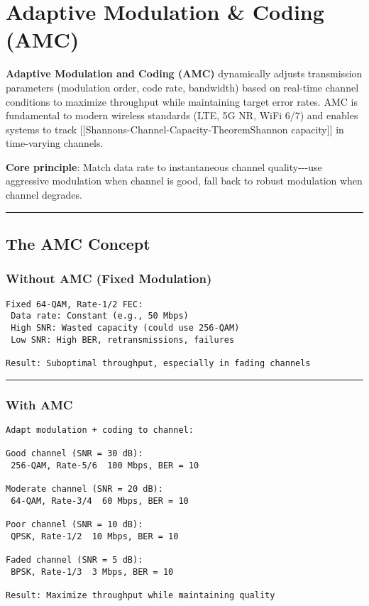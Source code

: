 \section{Adaptive Modulation \& Coding
(AMC)}\label{adaptive-modulation-coding-amc}

\textbf{Adaptive Modulation and Coding (AMC)} dynamically adjusts
transmission parameters (modulation order, code rate, bandwidth) based
on real-time channel conditions to maximize throughput while maintaining
target error rates. AMC is fundamental to modern wireless standards
(LTE, 5G NR, WiFi 6/7) and enables systems to track
{[}{[}Shannon\textquotesingle s-Channel-Capacity-Theorem\textbar Shannon
capacity{]}{]} in time-varying channels.

\textbf{Core principle}: Match data rate to instantaneous channel
quality-\/-\/-use aggressive modulation when channel is good, fall back
to robust modulation when channel degrades.

\begin{center}\rule{0.5\linewidth}{0.5pt}\end{center}

\subsection{\texorpdfstring{ The AMC
Concept}{ The AMC Concept}}\label{the-amc-concept}

\subsubsection{Without AMC (Fixed
Modulation)}\label{without-amc-fixed-modulation}

\begin{verbatim}
Fixed 64-QAM, Rate-1/2 FEC:
 Data rate: Constant (e.g., 50 Mbps)
 High SNR: Wasted capacity (could use 256-QAM)
 Low SNR: High BER, retransmissions, failures

Result: Suboptimal throughput, especially in fading channels
\end{verbatim}

\begin{center}\rule{0.5\linewidth}{0.5pt}\end{center}

\subsubsection{With AMC}\label{with-amc}

\begin{verbatim}
Adapt modulation + coding to channel:

Good channel (SNR = 30 dB):
 256-QAM, Rate-5/6  100 Mbps, BER = 10 

Moderate channel (SNR = 20 dB):
 64-QAM, Rate-3/4  60 Mbps, BER = 10 

Poor channel (SNR = 10 dB):
 QPSK, Rate-1/2  10 Mbps, BER = 10 

Faded channel (SNR = 5 dB):
 BPSK, Rate-1/3  3 Mbps, BER = 10 

Result: Maximize throughput while maintaining quality
\end{verbatim}

